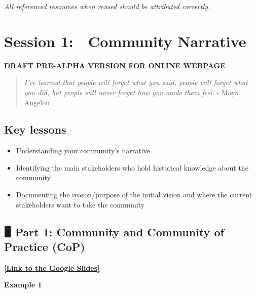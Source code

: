 \documentclass[
  letterpaper,
  DIV=11,
  numbers=noendperiod]{scrreport}
\providecommand{\tightlist}{%
  \setlength{\itemsep}{0pt}\setlength{\parskip}{0pt}}\usepackage{longtable,booktabs,array}
\begin{document}
\emph{All referenced resources when reused should be attributed
correctly.}


\hypertarget{session-1-community-narrative}{%
\chapter{Session 1: 🚧 Community
Narrative}\label{session-1-community-narrative}}

\textbf{DRAFT PRE-ALPHA VERSION FOR ONLINE WEBPAGE}

\begin{quote}
\emph{I've learned that people will forget what you said, people will
forget what you did, but people will never forget how you made them
feel.} - Maya Angelou
\end{quote}

\hypertarget{key-lessons}{%
\section{Key lessons}\label{key-lessons}}

\begin{itemize}
\tightlist
\item
  Understanding your community's narrative
\item
  Identifying the main stakeholders who hold historical knowledge about
  the community
\item
  Documenting the reason/purpose of the initial vision and where the
  current stakeholders want to take the community
\end{itemize}

\hypertarget{part-1-community-and-community-of-practice-cop}{%
\section{🖥 Part 1: Community and Community of Practice
(CoP)}\label{part-1-community-and-community-of-practice-cop}}

\href{https://docs.google.com/presentation/d/1FlBt454su5wmELNfua_1EpoStjgzm4G7emKki-cuTBg/edit?usp=sharing}{\textbf{{[}Link
to the Google Slides{]}}}

\textbf{Example 1}
\end{document}
